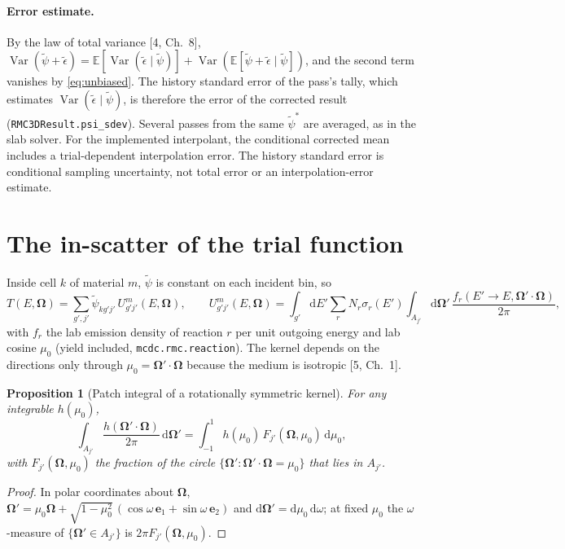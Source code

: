 \documentclass[11pt]{article}
\newtheorem{proposition}{Proposition}
\newcommand{\tpsi}{\tilde\psi}
\newcommand{\teps}{\tilde\epsilon}
\newcommand{\Om}{\boldsymbol\Omega}
\newcommand{\E}{\mathbb{E}}
\begin{document}
\paragraph{Error estimate.} By the law of total variance [4, Ch.~8],
$\operatorname{Var}(\tpsi+\teps) = \E[\operatorname{Var}(\teps\mid\tpsi)] +
\operatorname{Var}(\E[\tpsi+\teps\mid\tpsi])$, and the second term vanishes by
\eqref{eq:unbiased}. The history standard error of the pass's tally, which estimates
$\operatorname{Var}(\teps\mid\tpsi)$, is therefore the error of the corrected result
(\texttt{RMC3DResult.psi\_sdev}). Several passes from the same $\tpsi^*$ are averaged,
as in the slab solver.
For the implemented interpolant, the conditional corrected mean includes a
trial-dependent interpolation error. The history standard error is conditional
sampling uncertainty, not total error or an interpolation-error estimate.

\section{The in-scatter of the trial function}

Inside cell $k$ of material $m$, $\tpsi$ is constant on each incident bin, so
\begin{equation}
  T(E,\Om) = \sum_{g',j'} \tpsi_{kg'j'}\, U^m_{g'j'}(E,\Om),\qquad
  U^m_{g'j'}(E,\Om) = \int_{g'}\!\mathrm dE' \sum_r N_r\sigma_r(E')
     \int_{A_{j'}}\!\mathrm d\Om'\, \frac{f_r(E'\!\to E,\Om'\cdot\Om)}{2\pi},
  \label{eq:U}
\end{equation}
with $f_r$ the lab emission density of reaction $r$ per unit outgoing energy and lab
cosine $\mu_0$ (yield included, \texttt{mcdc.rmc.reaction}). The kernel depends on
the directions only through $\mu_0=\Om'\cdot\Om$ because the medium is isotropic
[5, Ch.~1].

\begin{proposition}[Patch integral of a rotationally symmetric kernel]
For any integrable $h(\mu_0)$,
\begin{equation}
  \int_{A_{j'}} \frac{h(\Om'\cdot\Om)}{2\pi}\,\mathrm d\Om' =
  \int_{-1}^{1} h(\mu_0)\, F_{j'}(\Om,\mu_0)\,\mathrm d\mu_0 ,
\end{equation}
with $F_{j'}(\Om,\mu_0)$ the fraction of the circle
$\{\Om' : \Om'\cdot\Om = \mu_0\}$ that lies in $A_{j'}$.
\end{proposition}
\begin{proof}
In polar coordinates about $\Om$,
$\Om' = \mu_0\Om + \sqrt{1-\mu_0^2}\,(\cos\omega\,\mathbf e_1 + \sin\omega\,\mathbf e_2)$
and $\mathrm d\Om' = \mathrm d\mu_0\,\mathrm d\omega$; at fixed $\mu_0$ the
$\omega$-measure of $\{\Om'\in A_{j'}\}$ is $2\pi F_{j'}(\Om,\mu_0)$.
\end{proof}
\end{document}

